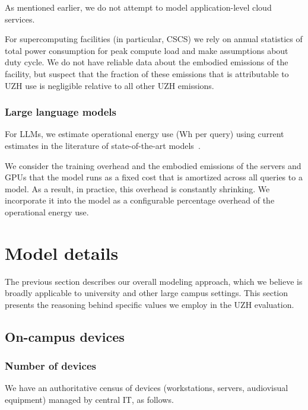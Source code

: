 \documentclass[11pt]{article}
\let\cite\parencite
\begin{document}
As mentioned earlier, we do not attempt to model application-level cloud services.

For supercomputing facilities (in particular, CSCS) we rely on annual statistics of total power consumption for peak compute load and make assumptions about duty cycle. We do not have reliable data about the embodied emissions of the facility, but suspect that the fraction of these emissions that is attributable to UZH use is negligible relative to all other UZH emissions.

\subsubsection*{Large language models}

For LLMs, we estimate operational energy use (Wh per query) using current estimates in the literature of state-of-the-art models~\cite{devries2023growing,epoch2025howmuchenergydoeschatgptuse}.

We consider the training overhead and the embodied emissions of the servers and GPUs that the model runs as a fixed cost that is amortized across all queries to a model. As a result, in practice, this overhead is constantly shrinking. We incorporate it into the model as a configurable percentage overhead of the operational energy use.

\section{Model details}
\label{sec:model:details}

The previous section describes our overall modeling approach, which we believe is broadly applicable to university and other large campus settings. This section presents the reasoning behind specific values we employ in the UZH evaluation.

\subsection{On-campus devices}

\subsubsection*{Number of devices}

We have an authoritative census of devices (workstations, servers, audiovisual equipment) managed by central IT, as follows.
\end{document}
